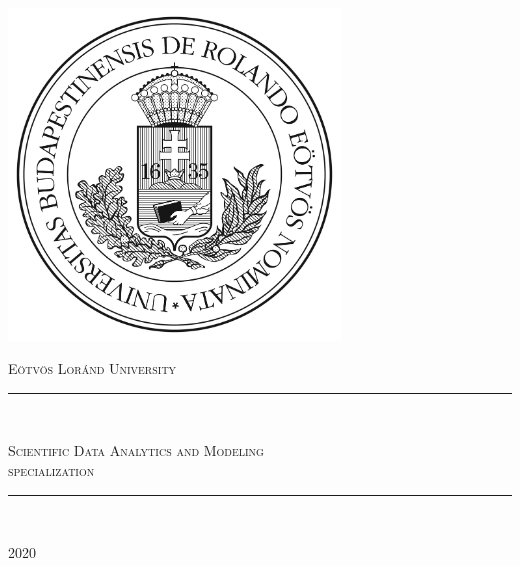 \documentclass[a4paper]{article}
\begin{document}
\begin{titlepage}

    \centering
    \includegraphics[width=0.66\textwidth]{elte.jpg}\par\vspace{1cm}
    {\scshape\LARGE Eötvös Loránd University \par}
    \vspace{1cm}
    \rule{140mm}{0.1mm}\\
    \vspace{.5cm}
    {\scshape\Large Scientific Data Analytics and Modeling \\ specialization \par}
    \vspace{.5cm}
    \rule{140mm}{0.1mm}\\

    \vfill
    
    {\large 2020 \par}
\end{titlepage}

\newpage

\tableofcontents




\end{document}
